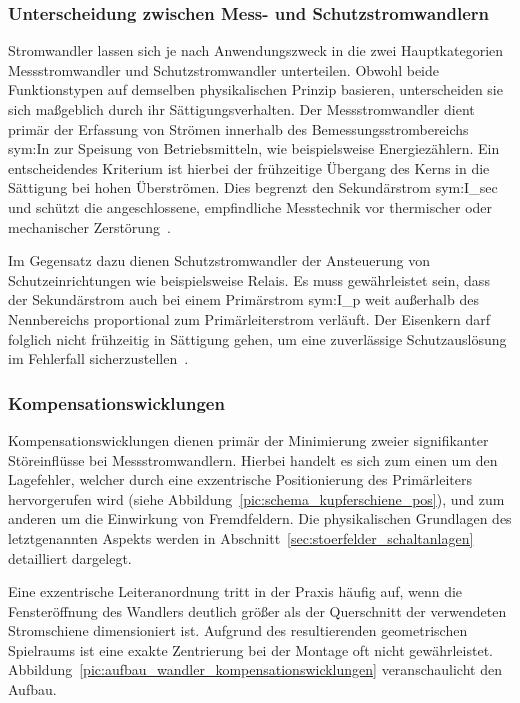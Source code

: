\subsubsection{Unterscheidung zwischen Mess- und Schutzstromwandlern}
\label{sec:unterschiede_mess_schutzwandler}

Stromwandler lassen sich je nach Anwendungszweck in die zwei Hauptkategorien Messstromwandler und Schutzstromwandler unterteilen. Obwohl beide Funktionstypen auf demselben physikalischen Prinzip basieren, unterscheiden sie sich maßgeblich durch ihr Sättigungsverhalten. Der Messstromwandler dient primär der Erfassung von Strömen innerhalb des Bemessungsstrombereichs \gls{sym:In} zur Speisung von Betriebsmitteln, wie beispielsweise Energiezählern. Ein entscheidendes Kriterium ist hierbei der frühzeitige Übergang des Kerns in die Sättigung bei hohen Überströmen. Dies begrenzt den Sekundärstrom \gls{sym:I_sec} und schützt die angeschlossene, empfindliche Messtechnik vor thermischer oder mechanischer Zerstörung~\cite[Kap.~2.2]{book-Einmaleins_Stromwandler-Redur}.

Im Gegensatz dazu dienen Schutzstromwandler der Ansteuerung von Schutzeinrichtungen wie beispielsweise Relais. Es muss gewährleistet sein, dass der Sekundärstrom auch bei einem Primärstrom \gls{sym:I_p} weit außerhalb des Nennbereichs proportional zum Primärleiterstrom verläuft. Der Eisenkern darf folglich nicht frühzeitig in Sättigung gehen, um eine zuverlässige Schutzauslösung im Fehlerfall sicherzustellen~\cite[Kap.~2.2]{book-Einmaleins_Stromwandler-Redur}.


\subsubsection{Kompensationswicklungen}
\label{sec:kompensationswicklungen}

Kompensationswicklungen dienen primär der Minimierung zweier signifikanter Störeinflüsse bei Messstromwandlern. Hierbei handelt es sich zum einen um den Lagefehler, welcher durch eine exzentrische Positionierung des Primärleiters hervorgerufen wird (siehe Abbildung~\ref{pic:schema_kupferschiene_pos}), und zum anderen um die Einwirkung von Fremdfeldern. Die physikalischen Grundlagen des letztgenannten Aspekts werden in Abschnitt~\ref{sec:stoerfelder_schaltanlagen} detailliert dargelegt.

Eine exzentrische Leiteranordnung tritt in der Praxis häufig auf, wenn die Fensteröffnung des Wandlers deutlich größer als der Querschnitt der verwendeten Stromschiene dimensioniert ist. Aufgrund des resultierenden geometrischen Spielraums ist eine exakte Zentrierung bei der Montage oft nicht gewährleistet. Abbildung~\ref{pic:aufbau_wandler_kompensationswicklungen} veranschaulicht den Aufbau. 

